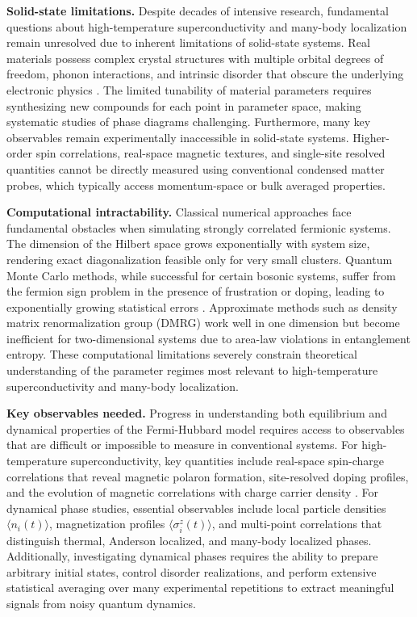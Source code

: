 
\textbf{Solid-state limitations.} Despite decades of intensive research, fundamental questions about high-temperature superconductivity and many-body localization remain unresolved due to inherent limitations of solid-state systems. Real materials possess complex crystal structures with multiple orbital degrees of freedom, phonon interactions, and intrinsic disorder that obscure the underlying electronic physics \cite{koepsell_quantum_2021}. The limited tunability of material parameters requires synthesizing new compounds for each point in parameter space, making systematic studies of phase diagrams challenging. Furthermore, many key observables remain experimentally inaccessible in solid-state systems. Higher-order spin correlations, real-space magnetic textures, and single-site resolved quantities cannot be directly measured using conventional condensed matter probes, which typically access momentum-space or bulk averaged properties.

\textbf{Computational intractability.} Classical numerical approaches face fundamental obstacles when simulating strongly correlated fermionic systems. The dimension of the Hilbert space grows exponentially with system size, rendering exact diagonalization feasible only for very small clusters. Quantum Monte Carlo methods, while successful for certain bosonic systems, suffer from the fermion sign problem in the presence of frustration or doping, leading to exponentially growing statistical errors \cite{koepsell_quantum_2021}. Approximate methods such as density matrix renormalization group (DMRG) work well in one dimension but become inefficient for two-dimensional systems due to area-law violations in entanglement entropy. These computational limitations severely constrain theoretical understanding of the parameter regimes most relevant to high-temperature superconductivity and many-body localization.

\textbf{Key observables needed.} Progress in understanding both equilibrium and dynamical properties of the Fermi-Hubbard model requires access to observables that are difficult or impossible to measure in conventional systems. For high-temperature superconductivity, key quantities include real-space spin-charge correlations that reveal magnetic polaron formation, site-resolved doping profiles, and the evolution of magnetic correlations with charge carrier density \cite{koepsell_quantum_2021}. For dynamical phase studies, essential observables include local particle densities $\langle n_i(t) \rangle$, magnetization profiles $\langle \sigma^z_i(t) \rangle$, and multi-point correlations that distinguish thermal, Anderson localized, and many-body localized phases. Additionally, investigating dynamical phases requires the ability to prepare arbitrary initial states, control disorder realizations, and perform extensive statistical averaging over many experimental repetitions to extract meaningful signals from noisy quantum dynamics.